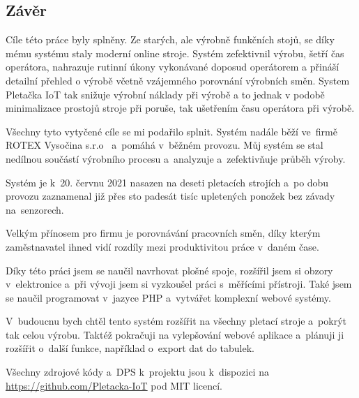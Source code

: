 \documentclass[12pt, a4paper]{article}
\begin{document}
\subsection*{Závěr}



Cíle této práce byly splněny. Ze starých, ale výrobně funkčních stojů, se díky mému systému staly moderní online stroje.
Systém zefektivnil výrobu, šetří čas operátora, nahrazuje rutinní úkony vykonávané doposud operátorem a přináší detailní přehled o výrobě včetně vzájemného porovnání výrobních směn.
System Pletačka IoT tak snižuje výrobní náklady při výrobě a to jednak v podobě minimalizace prostojů stroje při poruše, tak ušetřením času operátora při výrobě.

Všechny tyto vytyčené cíle se mi podařilo splnit. 
Systém nadále běží ve~firmě ROTEX Vysočina s.r.o~\cite{ROTEX} a~pomáhá v~běžném provozu.
Můj systém se stal nedílnou součástí výrobního procesu a analyzuje a~zefektivňuje průběh výroby.

Systém je k 20. červnu 2021 nasazen na deseti pletacích strojích a po dobu provozu zaznamenal již přes sto padesát tisíc upletených ponožek bez závady na~senzorech.

Velkým přínosem pro firmu je porovnávání pracovních směn, díky kterým zaměstnavatel ihned vidí rozdíly mezi produktivitou práce v~daném čase.

Díky této práci jsem se naučil navrhovat plošné spoje, rozšířil jsem si obzory v~elektronice a~při vývoji jsem si vyzkoušel práci s~měřícími přístroji. 
Také jsem se naučil programovat v~jazyce PHP a~vytvářet komplexní webové systémy.

V~budoucnu bych chtěl tento systém rozšířit na všechny pletací stroje a~pokrýt tak celou výrobu.
Taktéž pokračuji na vylepšování webové aplikace a~plánuji ji rozšířit o~další funkce, například o~export dat do tabulek.

Všechny zdrojové kódy a~DPS k~projektu jsou k~dispozici na \url{https://github.com/Pletacka-IoT} pod MIT licencí.

\newpage


\printbibliography[title=Literatura]



\appendix



\end{document}
